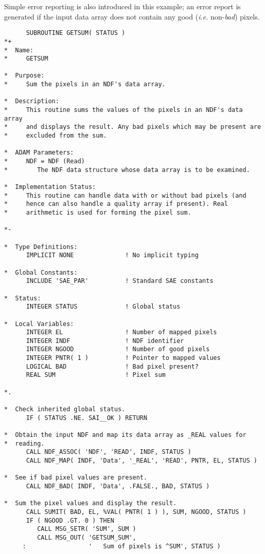 \documentclass[twoside,11pt]{article}
\newcommand{\st}[1]{{\em{#1}}}
\begin{document}
Simple error reporting is also introduced in this example; an error report is
generated if the input data array does not contain any good (\st{i.e.\/}
non-\st{bad\/}) pixels.

\small
\begin{verbatim}
      SUBROUTINE GETSUM( STATUS )
*+
*  Name:
*     GETSUM

*  Purpose:
*     Sum the pixels in an NDF's data array.

*  Description:
*     This routine sums the values of the pixels in an NDF's data array
*     and displays the result. Any bad pixels which may be present are
*     excluded from the sum.

*  ADAM Parameters:
*     NDF = NDF (Read)
*        The NDF data structure whose data array is to be examined.

*  Implementation Status:
*     This routine can handle data with or without bad pixels (and
*     hence can also handle a quality array if present). Real
*     arithmetic is used for forming the pixel sum.

*-
      
*  Type Definitions:
      IMPLICIT NONE              ! No implicit typing

*  Global Constants:
      INCLUDE 'SAE_PAR'          ! Standard SAE constants

*  Status:
      INTEGER STATUS             ! Global status

*  Local Variables:
      INTEGER EL                 ! Number of mapped pixels
      INTEGER INDF               ! NDF identifier
      INTEGER NGOOD              ! Number of good pixels
      INTEGER PNTR( 1 )          ! Pointer to mapped values
      LOGICAL BAD                ! Bad pixel present?
      REAL SUM                   ! Pixel sum

*.

*  Check inherited global status.
      IF ( STATUS .NE. SAI__OK ) RETURN

*  Obtain the input NDF and map its data array as _REAL values for
*  reading.
      CALL NDF_ASSOC( 'NDF', 'READ', INDF, STATUS )
      CALL NDF_MAP( INDF, 'Data', '_REAL', 'READ', PNTR, EL, STATUS )

*  See if bad pixel values are present.
      CALL NDF_BAD( INDF, 'Data', .FALSE., BAD, STATUS )

*  Sum the pixel values and display the result.
      CALL SUMIT( BAD, EL, %VAL( PNTR( 1 ) ), SUM, NGOOD, STATUS )
      IF ( NGOOD .GT. 0 ) THEN
         CALL MSG_SETR( 'SUM', SUM )
         CALL MSG_OUT( 'GETSUM_SUM',
     :                 '   Sum of pixels is ^SUM', STATUS )


\end{verbatim}
\end{document}
